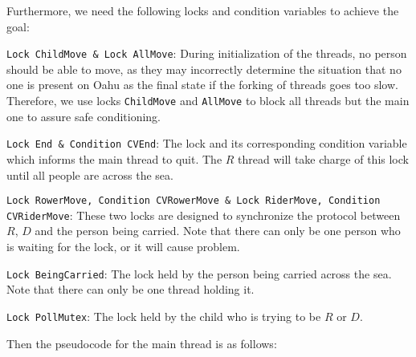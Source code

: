 \documentclass{article}
\begin{document}
\begin{spacing}{1.1}
    Furthermore, we need the following locks and condition variables to achieve the goal:\\
    \begin{asparaitem}
    \item \texttt{Lock ChildMove \& Lock AllMove}: During initialization of the threads, no person should be able to move, as they may incorrectly determine the situation that no one is present on Oahu as the final state if the forking of threads goes too slow. Therefore, we use locks \texttt{ChildMove} and \texttt{AllMove} to block all threads but the main one to assure safe conditioning.\\
    \item \texttt{Lock End \& Condition CVEnd}: The lock and its corresponding condition variable which informs the main thread to quit. The $R$ thread will take charge of this lock until all people are across the sea.\\
    \item \texttt{Lock RowerMove, Condition CVRowerMove \& Lock RiderMove, Condition CVRiderMove}: These two locks are designed to synchronize the protocol between $R$, $D$ and the person being carried. Note that there can only be one person who is waiting for the lock, or it will cause problem.\\
    \item \texttt{Lock BeingCarried}: The lock held by the person being carried across the sea. Note that there can only be one thread holding it.\\
    \item \texttt{Lock PollMutex}: The lock held by the child who is trying to be $R$ or $D$.\\
    \end{asparaitem}

    Then the pseudocode for the main thread is as follows:


\end{spacing}
\end{document}
